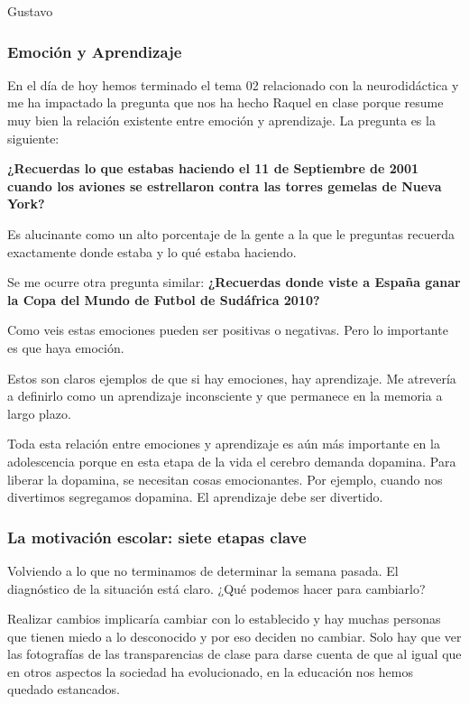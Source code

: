 \begin{opin}{\guscolor}{Gustavo}

\subsubsection{Emoción y Aprendizaje}

En el día de hoy hemos terminado el tema 02 relacionado con la neurodidáctica y me ha impactado la pregunta que nos ha hecho Raquel en clase porque resume muy bien la relación existente entre emoción y aprendizaje. La pregunta es la siguiente:

\textbf{¿Recuerdas lo que estabas haciendo el 11 de Septiembre de 2001 cuando los aviones se estrellaron contra las torres gemelas de Nueva York?}

Es alucinante como un alto porcentaje de la gente a la que le preguntas recuerda exactamente donde estaba y lo qué estaba haciendo.

Se me ocurre otra pregunta similar: \textbf{¿Recuerdas donde viste a España ganar la Copa del Mundo de Futbol de Sudáfrica 2010?}

Como veis estas emociones pueden ser positivas o negativas. Pero lo importante es que haya emoción.

Estos son claros ejemplos de que si hay emociones, hay aprendizaje. Me atrevería a definirlo como un aprendizaje inconsciente y que permanece en la memoria a largo plazo.

Toda esta relación entre emociones y aprendizaje es aún más importante en la adolescencia porque en esta etapa de la vida el cerebro demanda dopamina. Para liberar la dopamina, se necesitan cosas emocionantes. Por ejemplo, cuando nos divertimos segregamos dopamina. El aprendizaje debe ser divertido. 

\subsubsection{La motivación escolar: siete etapas clave}

Volviendo a lo que no terminamos de determinar la semana pasada. El diagnóstico de la situación está claro. ¿Qué podemos hacer para cambiarlo?

Realizar cambios implicaría cambiar con lo establecido y hay muchas personas que tienen miedo a lo desconocido y por eso deciden no cambiar. Solo hay que ver las fotografías de las transparencias de clase para darse cuenta de que al igual que en otros aspectos la sociedad ha evolucionado, en la educación nos hemos quedado estancados.



\end{opin}
